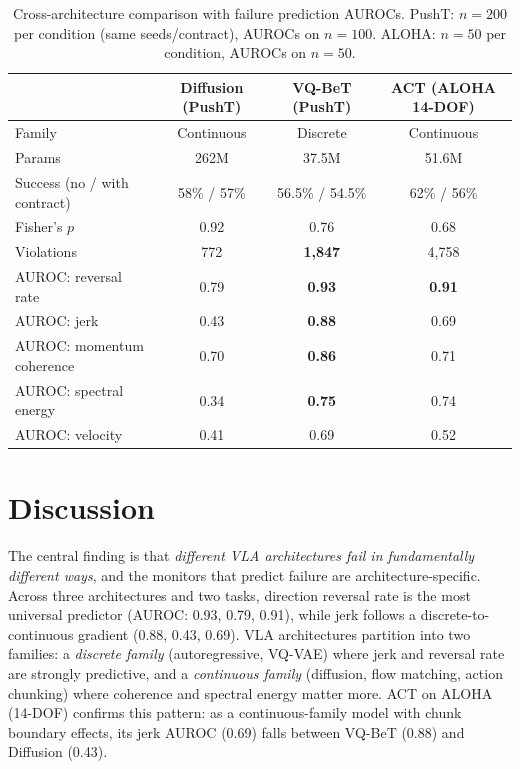 \documentclass[conference]{IEEEtran}
\begin{document}
\begin{table}[t]
\centering
\caption{Cross-architecture comparison with failure prediction AUROCs. PushT: $n{=}200$ per condition (same seeds/contract), AUROCs on $n{=}100$. ALOHA: $n{=}50$ per condition, AUROCs on $n{=}50$.}
\label{tab:crossarch}
\small
\begin{tabular}{lccc}
\toprule
 & \textbf{Diffusion (PushT)} & \textbf{VQ-BeT (PushT)} & \textbf{ACT (ALOHA 14-DOF)} \\
\midrule
Family & Continuous & Discrete & Continuous \\
Params & 262M & 37.5M & 51.6M \\
Success (no / with contract) & 58\% / 57\% & 56.5\% / 54.5\% & 62\% / 56\% \\
Fisher's $p$ & 0.92 & 0.76 & 0.68 \\
Violations & 772 & \textbf{1{,}847} & 4{,}758 \\
\midrule
AUROC: reversal rate & 0.79 & \textbf{0.93} & \textbf{0.91} \\
AUROC: jerk & 0.43 & \textbf{0.88} & 0.69 \\
AUROC: momentum coherence & 0.70 & \textbf{0.86} & 0.71 \\
AUROC: spectral energy & 0.34 & \textbf{0.75} & 0.74 \\
AUROC: velocity & 0.41 & 0.69 & 0.52 \\
\bottomrule
\end{tabular}
\end{table}

\section{Discussion}

The central finding is that \emph{different VLA architectures fail in fundamentally different ways}, and the monitors that predict failure are architecture-specific.
Across three architectures and two tasks, direction reversal rate is the most universal predictor (AUROC: 0.93, 0.79, 0.91), while jerk follows a discrete-to-continuous gradient (0.88, 0.43, 0.69).
VLA architectures partition into two families: a \emph{discrete family} (autoregressive, VQ-VAE) where jerk and reversal rate are strongly predictive, and a \emph{continuous family} (diffusion, flow matching, action chunking) where coherence and spectral energy matter more.
ACT on ALOHA (14-DOF) confirms this pattern: as a continuous-family model with chunk boundary effects, its jerk AUROC (0.69) falls between VQ-BeT (0.88) and Diffusion (0.43).
\end{document}
